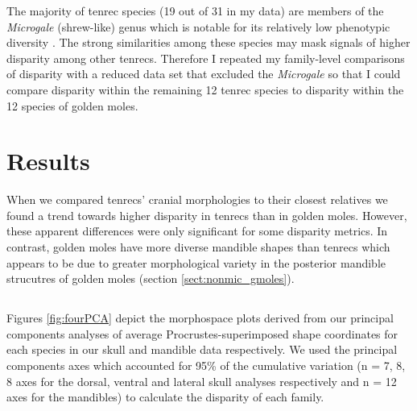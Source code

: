 	The majority of tenrec species (19 out of 31 in my data) are members of the \textit{Microgale} (shrew-like) genus which is notable for its relatively low phenotypic diversity \citep{ Soarimalala2011, Jenkins2003}. The strong similarities among these species may mask signals of higher disparity among other tenrecs. Therefore I repeated my family-level comparisons of disparity with a reduced data set that excluded the \textit{Microgale} so that I could compare disparity within the remaining 12 tenrec species to disparity within the 12 species of golden moles.

\section{Results} %

	When we compared tenrecs' cranial morphologies to their closest relatives we found a trend towards higher disparity in tenrecs than
	in golden moles. However, these apparent differences were only
	significant for some disparity metrics. In contrast, golden moles have more diverse mandible shapes than tenrecs which appears to be due to greater morphological variety in the posterior mandible strucutres of golden moles (section \ref{sect:nonmic_gmoles}).

\subsection{}
	Figures  \ref{fig:fourPCA} depict the morphospace plots derived from our principal components analyses of average Procrustes-superimposed shape coordinates for each species in our skull and mandible data respectively. We used the principal components axes which accounted for 95\% of the cumulative variation (n = 7, 8, 8 axes for the dorsal, ventral and lateral skull analyses respectively and n = 12 axes for the mandibles) to calculate the disparity of each family. 

